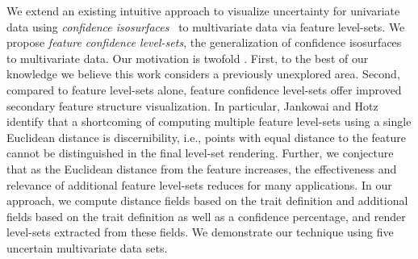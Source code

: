 We extend an existing intuitive  approach to visualize uncertainty for univariate data using \textit{confidence isosurfaces}~\cite{zehner2010visualization} to multivariate data via feature level-sets.
%
We propose \textit{feature confidence level-sets}, the generalization of confidence isosurfaces to multivariate data.
%
Our motivation is twofold .
%
First, to the best of our knowledge we believe this work considers a previously unexplored area. 
%
Second, compared to feature level-sets alone, feature confidence level-sets offer improved secondary feature structure visualization.
%
In particular, Jankowai and Hotz identify that a shortcoming of computing multiple feature level-sets using a single Euclidean distance is discernibility, i.e., points with equal distance to the feature cannot be distinguished in the final level-set rendering.
Further, we conjecture that as the Euclidean distance from the feature increases, the effectiveness and relevance of additional feature level-sets reduces for many applications.
In our approach, we compute distance fields based on the trait definition and additional fields based on the trait definition as well as a confidence percentage, and render level-sets extracted from these fields.
We demonstrate our technique using five  uncertain multivariate data sets.

